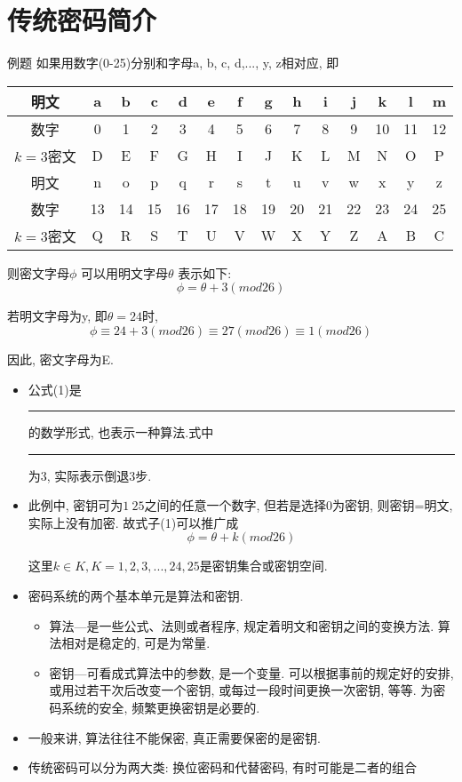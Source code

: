 \documentclass[UTF8]{ctexart}
\newcommand\hl{\bgroup\markoverwith
  {\textcolor{yellow}{\rule[-.5ex]{2pt}{2.5ex}}}\ULon}
\begin{document}
\section{传统密码简介}
例题 如果用数字(0-25)分别和字母a, b, c, d,..., y, z相对应, 即

    \begin{tabular}{|c|c|c|c|c|c|c|c|c|c|c|c|c|c|} %
        \hline
        明文& a& b& c& d& e& f& g& h& i& j& k& l& m\\
        \hline
        数字& 0& 1& 2& 3& 4& 5& 6& 7& 8& 9& 10& 11& 12\\
        \hline
        $k=3$密文& D& E& F& G& H& I& J& K& L& M& N& O& P\\
        \hline
        \hline
        明文& n& o& p& q& r& s& t& u& v& w& x& y& z\\
        \hline
        数字& 13& 14& 15& 16& 17& 18& 19& 20& 21& 22& 23& 24& 25\\
        \hline
        $k=3$密文& Q& R& S& T& U& V& W& X& Y& Z& A& B& C\\
        \hline
    \end{tabular}

    则密文字母$\phi$ 可以用明文字母$\theta$ 表示如下:
    \begin{equation}
        \phi = \theta + 3(mod26)
    \end{equation}

    若明文字母为y, 即$\theta = 24$时,
    $$\phi \equiv 24 + 3(mod26) \equiv 27(mod26) \equiv 1(mod26)$$

    因此, 密文字母为E.


    \begin{itemize}
        \renewcommand{\labelitemi}{\scriptsize$\blacksquare$}
        \item 公式(1)是\hl{凯撒密码}的数学形式, 也表示一种算法.式中\hl{密钥}为3, 实际表示倒退3步.
        \item 此例中, 密钥可为$1~ 25$之间的任意一个数字, 但若是选择0为密钥, 则密钥=明文, 实际上没有加密. 故式子(1)可以推广成
        $$\phi = \theta + k(mod 26)$$

        这里$k\in K, K={1, 2, 3,..., 24, 25}$是密钥集合或密钥空间.

        \item 密码系统的两个基本单元是算法和密钥.
        \begin{itemize}
            \item 算法---是一些公式、法则或者程序, 规定着明文和密钥之间的变换方法. 算法相对是稳定的, 可是为常量.
            \item 密钥---可看成式算法中的参数, 是一个变量. 可以根据事前的规定好的安排, 或用过若干次后改变一个密钥, 或每过一段时间更换一次密钥, 等等. 为密码系统的安全, 频繁更换密钥是必要的.
        \end{itemize}
        \item 一般来讲, 算法往往不能保密, 真正需要保密的是密钥.
        \item 传统密码可以分为两大类: 换位密码和代替密码, 有时可能是二者的组合
    \end{itemize}
\end{document}

